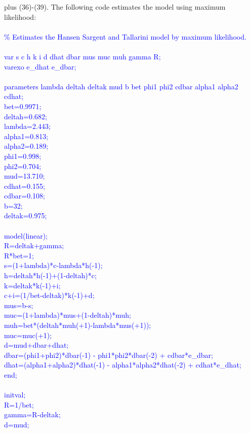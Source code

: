 \documentclass[a4paper,12pt]{scrartcl} %
\begin{document}
plus (36)-(39). The following code estimates the model using maximum likelihood:\\
\\
\textcolor{blue}{
\% Estimates the Hansen Sargent and Tallarini model by maximum likelihood.\\
\\
var s c h k i d dhat dbar mus muc muh gamma R;\\
varexo e\_dhat e\_dbar;\\
\\
parameters lambda deltah deltak mud b bet phi1 phi2 cdbar alpha1 alpha2 cdhat;\\
bet=0.9971;\\
deltah=0.682;\\
lambda=2.443;\\
alpha1=0.813;\\
alpha2=0.189;\\
phi1=0.998;\\
phi2=0.704;\\
mud=13.710;\\
cdhat=0.155;\\
cdbar=0.108;\\
b=32;\\
deltak=0.975;\\
\\
model(linear);\\
R=deltak+gamma;\\
R*bet=1;\\
s=(1+lambda)*c-lambda*h(-1);\\
h=deltah*h(-1)+(1-deltah)*c;\\
k=deltak*k(-1)+i;\\
c+i=(1/bet-deltak)*k(-1)+d;\\
mus=b-s;\\
muc=(1+lambda)*mus+(1-deltah)*muh;\\
muh=bet*(deltah*muh(+1)-lambda*mus(+1));\\
muc=muc(+1);\\
d=mud+dbar+dhat;\\
dbar=(phi1+phi2)*dbar(-1) - phi1*phi2*dbar(-2) + cdbar*e\_dbar;\\
dhat=(alpha1+alpha2)*dhat(-1) - alpha1*alpha2*dhat(-2) + cdhat*e\_dhat;\\
end;\\
\\
initval;\\
R=1/bet;\\
gamma=R-deltak;\\
d=mud;\\
}
\end{document}
